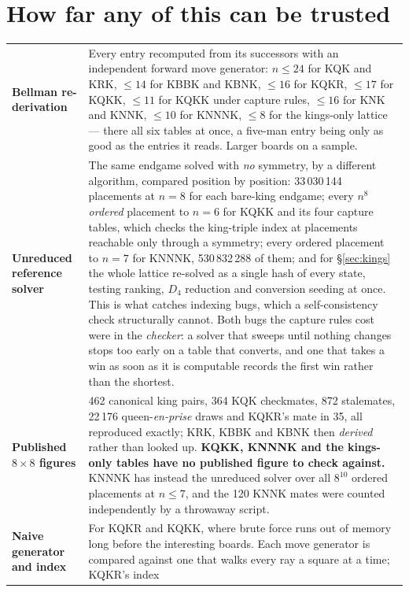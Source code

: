 \documentclass[10pt]{article}
\begin{document}
\section{How far any of this can be trusted}\label{sec:trust}

\begin{center}\small
\begin{tabular}{@{}lp{}@{}}
\toprule
\textbf{Bellman re-derivation} & Every entry recomputed from its successors
with an independent forward move generator: $n\le24$ for KQK and KRK, $\le14$
for KBBK and KBNK, $\le16$ for KQKR, $\le17$ for KQKK, $\le11$ for KQKK under
capture rules, $\le16$ for KNK and KNNK, $\le10$ for KNNNK, $\le8$ for the
kings-only lattice --- there all six tables at once, a five-man entry being
only as good as the entries it reads. Larger boards on a sample. \\[1.5mm]
\textbf{Unreduced reference solver} & The same endgame solved with \emph{no}
symmetry, by a different algorithm, compared position by position: 33\,030\,144
placements at $n=8$ for each bare-king endgame; every $n^8$ \emph{ordered}
placement to $n=6$ for KQKK and its four capture tables, which checks the
king-triple index at placements reachable only through a symmetry; every
ordered placement to $n=7$ for KNNNK, 530\,832\,288 of them; and for
\S\ref{sec:kings} the whole lattice re-solved as a single hash of every state,
testing ranking, $D_4$ reduction and conversion seeding at once. This is what
catches indexing bugs, which a self-consistency check structurally cannot. Both
bugs the capture rules cost were in the \emph{checker}: a solver that sweeps
until nothing changes stops too early on a table that converts, and one that
takes a win as soon as it is computable records the first win rather than the
shortest. \\[1.5mm]
\textbf{Published $8\times8$ figures} & 462 canonical king pairs, 364 KQK
checkmates, 872 stalemates, 22\,176 queen-\emph{en-prise} draws and KQKR's mate
in 35, all reproduced exactly; KRK, KBBK and KBNK then \emph{derived} rather
than looked up. \textbf{KQKK, KNNNK and the kings-only tables have no published
figure to check against.} KNNNK has instead the unreduced solver over all
$8^{10}$ ordered placements at $n\le7$, and the 120 KNNK mates were counted
independently by a throwaway script. \\[1.5mm]
\textbf{Naive generator and index} & For KQKR and KQKK, where brute force runs
out of memory long before the interesting boards. Each move generator is
compared against one that walks every ray a square at a time; KQKR's index

\end{tabular}
\end{center}
\end{document}
